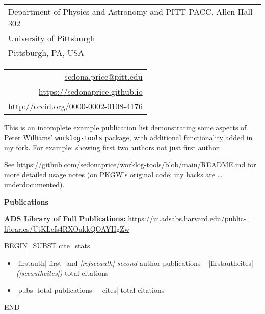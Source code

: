 \documentclass[line,10pt]{article}
\makeatletter
\newcommand{\myemail}{sedona.price@pitt.edu}
\newcommand{\mypostlineone}{Department of Physics and Astronomy and PITT PACC, Allen Hall 302}
\newcommand{\mypostlinetwo}{University of Pittsburgh}
\newcommand{\mypostlinethree}{Pittsburgh, PA, USA}
\newcommand{\mysite}{https://sedonaprice.github.io}
\newcommand{\myorcid}{http://orcid.org/0000-0002-0108-4176}
\makeatother
\begin{document}
\begin{minipage}{\textwidth}
  \vglue -10pt
  \hspace{-8.5pt}
    \begin{tabular}{l}    
        \mypostlineone\\
        \mypostlinetwo\\
        \mypostlinethree
    \end{tabular}
    \hfill \hspace{12pt} 
    \begin{tabular}{r}
        \href{mailto:\myemail}{\myemail}\\
        \url{\mysite}\\
        \url{\myorcid}
    \end{tabular}
  \end{minipage}



\thispagestyle{firststyle}


\vspace{12pt}

This is an incomplete example publication list demonstrating some aspects of 
Peter Williams' \texttt{worklog-tools} package, with 
additional functionality added in my fork.
For example: 
showing first two authors not just 
first author.  


\vspace{2pt} 
See \url{https://github.com/sedonaprice/worklog-tools/blob/main/README.md} 
for more detailed usage notes (on PKGW's original code; my hacks are \ldots
underdocumented).


\begin{center}
  {\large \textbf{Publications}}
\end{center}
  
  
  
  
  \noindent
  \noindent\textbf{ADS Library of Full Publications:} 
  \url{https://ui.adsabs.harvard.edu/public-libraries/UtKLcfs4RXOukkQOAYHgZw}
  
\vspace{8pt}


BEGIN_SUBST cite_stats
\begin{itemize}
  \item |firstauth| first- and \emph{|refsecauth| second-}author publications --
  |firstauthcites| \emph{(|secauthcites|)} total citations
  \item |pubs| total publications -- |cites| total citations
  \end{itemize}
END
\end{document}
